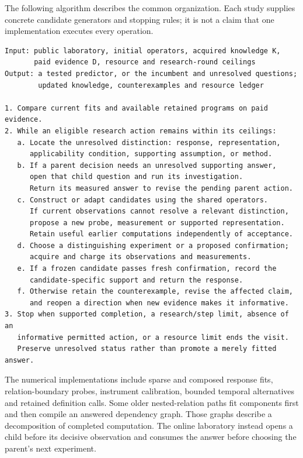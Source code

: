\documentclass[twoside,11pt]{article}
\begin{document}
The following algorithm describes the common organization. Each study supplies concrete candidate generators and stopping rules; it is not a claim that one implementation executes every operation.


\begin{Verbatim}[fontsize=\small,breaklines=true,breakanywhere=true]
Input: public laboratory, initial operators, acquired knowledge K,
       paid evidence D, resource and research-round ceilings
Output: a tested predictor, or the incumbent and unresolved questions;
        updated knowledge, counterexamples and resource ledger

1. Compare current fits and available retained programs on paid evidence.
2. While an eligible research action remains within its ceilings:
   a. Locate the unresolved distinction: response, representation,
      applicability condition, supporting assumption, or method.
   b. If a parent decision needs an unresolved supporting answer,
      open that child question and run its investigation.
      Return its measured answer to revise the pending parent action.
   c. Construct or adapt candidates using the shared operators.
      If current observations cannot resolve a relevant distinction,
      propose a new probe, measurement or supported representation.
      Retain useful earlier computations independently of acceptance.
   d. Choose a distinguishing experiment or a proposed confirmation;
      acquire and charge its observations and measurements.
   e. If a frozen candidate passes fresh confirmation, record the
      candidate-specific support and return the response.
   f. Otherwise retain the counterexample, revise the affected claim,
      and reopen a direction when new evidence makes it informative.
3. Stop when supported completion, a research/step limit, absence of an
   informative permitted action, or a resource limit ends the visit.
   Preserve unresolved status rather than promote a merely fitted answer.
\end{Verbatim}

The numerical implementations include sparse and composed response fits, relation-boundary probes, instrument calibration, bounded temporal alternatives and retained definition calls. Some older nested-relation paths fit components first and then compile an answered dependency graph. Those graphs describe a decomposition of completed computation. The online laboratory instead opens a child before its decisive observation and consumes the answer before choosing the parent's next experiment.
\end{document}

